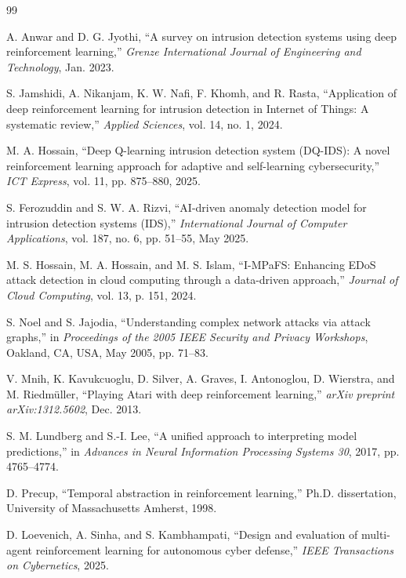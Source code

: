 \documentclass[conference]{IEEEtran}
\begin{document}
\begin{thebibliography}{99}

A. Anwar and D. G. Jyothi, ``A survey on intrusion detection systems using deep reinforcement learning,'' \textit{Grenze International Journal of Engineering and Technology}, Jan. 2023.

S. Jamshidi, A. Nikanjam, K. W. Nafi, F. Khomh, and R. Rasta, ``Application of deep reinforcement learning for intrusion detection in Internet of Things: A systematic review,'' \textit{Applied Sciences}, vol. 14, no. 1, 2024.

M. A. Hossain, ``Deep Q-learning intrusion detection system (DQ-IDS): A novel reinforcement learning approach for adaptive and self-learning cybersecurity,'' \textit{ICT Express}, vol. 11, pp. 875--880, 2025.

S. Ferozuddin and S. W. A. Rizvi, ``AI-driven anomaly detection model for intrusion detection systems (IDS),'' \textit{International Journal of Computer Applications}, vol. 187, no. 6, pp. 51--55, May 2025.

M. S. Hossain, M. A. Hossain, and M. S. Islam, ``I-MPaFS: Enhancing EDoS attack detection in cloud computing through a data-driven approach,'' \textit{Journal of Cloud Computing}, vol. 13, p. 151, 2024.

S. Noel and S. Jajodia, ``Understanding complex network attacks via attack graphs,'' in \textit{Proceedings of the 2005 IEEE Security and Privacy Workshops}, Oakland, CA, USA, May 2005, pp. 71--83.

V. Mnih, K. Kavukcuoglu, D. Silver, A. Graves, I. Antonoglou, D. Wierstra, and M. Riedmüller, ``Playing Atari with deep reinforcement learning,'' \textit{arXiv preprint arXiv:1312.5602}, Dec. 2013.

S. M. Lundberg and S.-I. Lee, ``A unified approach to interpreting model predictions,'' in \textit{Advances in Neural Information Processing Systems 30}, 2017, pp. 4765--4774.

D. Precup, ``Temporal abstraction in reinforcement learning,'' Ph.D. dissertation, University of Massachusetts Amherst, 1998.

D. Loevenich, A. Sinha, and S. Kambhampati, ``Design and evaluation of multi-agent reinforcement learning for autonomous cyber defense,'' \textit{IEEE Transactions on Cybernetics}, 2025.


\end{thebibliography}
\end{document}
